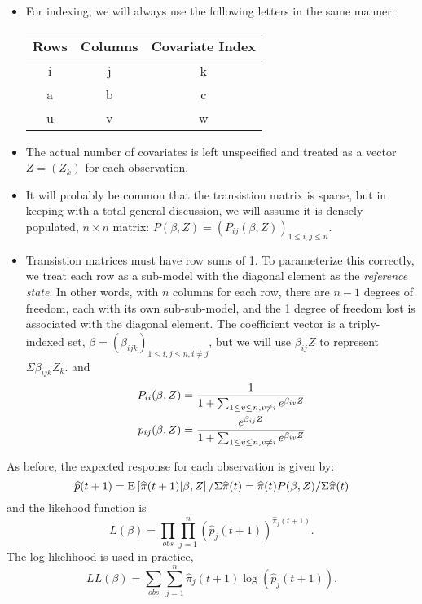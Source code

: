 \documentclass[10pt]{article}
\begin{document}
\begin{itemize}
\item For indexing, we will always use the following letters in the same manner:

\begin{tabular}{|c|c|c|}\hline
Rows & Columns & Covariate Index \\ \hline
i & j & k\\ \hline
a & b & c\\ \hline
u & v & w\\ \hline
\end{tabular}

\item The actual number of covariates is left unspecified and  treated as a vector $Z=(Z_k)$ for each observation.
\item It will probably be common that the transistion matrix is sparse, but in keeping with a total general discussion, we will assume it
is densely populated, $n\times n$ matrix: $P(\beta,Z)=(P_{ij}(\beta,Z))_{1\le i,j \le n}.$
\item Transistion matrices must have row sums of 1.  To parameterize this correctly, we treat each row as a sub-model with the diagonal element
as the {\em reference state}.  In other words, with $n$ columns for each row, there are $n-1$ degrees of freedom, each with its own sub-sub-model, and
the 1 degree of freedom lost is associated with the diagonal element.  The coefficient vector is a triply-indexed set, $\beta=(\beta_{ijk})_{1 \le i,j \le n, i\not = j}$,
but we will use $\beta_{ij}Z$ to represent $\Sigma \beta_{ijk}Z_k$.
and 
\begin{align*}
P_{ii}(\beta, Z)&= {1 \over {1+\sum_{1 \le v \le n, v \not = i} e^{\beta_{iv}Z}}}\\
p_{ij}(\beta, Z)&= {e^{\beta_{ij}Z} \over {1+\sum_{1 \le v \le n, v \not = i} e^{\beta_{iv}Z}}}
\end{align*}

\end{itemize}

As before, the expected response for each observation is given by:
$$\widehat{p}(t+1)=\text{E}\left[{{\widehat{\pi}(t+1)}|{\beta,Z}}\right]/\Sigma \widehat{\pi}(t) = \widehat{\pi}(t)P(\beta,Z)/\Sigma \widehat{\pi}(t)$$
and the likehood function is 
$$L(\beta)=\prod_{obs} \prod_{j=1}^n(\widehat{p}_j(t+1))^{\widehat{\pi}_j(t+1)}.$$
The log-likelihood is used in practice,
$$LL(\beta)=\sum_{obs} \sum_{j=1}^n {\widehat{\pi}_j(t+1)}\log(\widehat{p}_j(t+1)).$$
\end{document}
